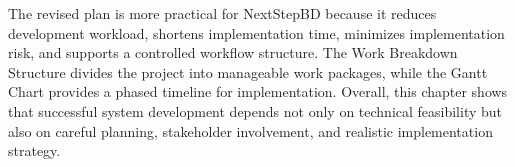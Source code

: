 \documentclass[12pt,a4paper]{report}
\begin{document}
The revised plan is more practical for NextStepBD because it reduces development workload, shortens implementation time, minimizes implementation risk, and supports a controlled workflow structure. The Work Breakdown Structure divides the project into manageable work packages, while the Gantt Chart provides a phased timeline for implementation. Overall, this chapter shows that successful system development depends not only on technical feasibility but also on careful planning, stakeholder involvement, and realistic implementation strategy.
\end{document}
